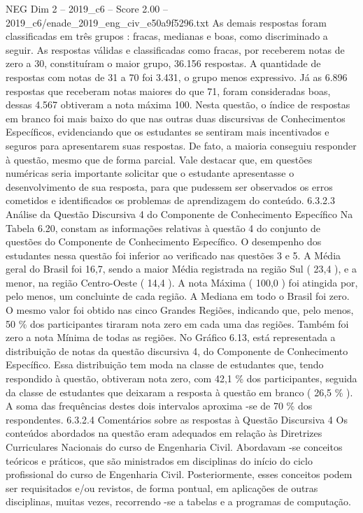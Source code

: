 \begin{textsample}{NEG Dim 2 – 2019\_c6 – Score 2.00 – 2019\_c6/enade\_2019\_eng\_civ\_e50a9f5296.txt}
As demais respostas foram classificadas em três grupos : fracas, medianas e boas, como discriminado a seguir.
As respostas válidas e classificadas como fracas, por receberem notas de zero a 30, constituíram o maior grupo, 36.156 respostas.
A quantidade de respostas com notas de 31 a 70 foi 3.431, o grupo menos expressivo.
Já as 6.896 respostas que receberam notas maiores do que 71, foram consideradas boas, dessas 4.567 obtiveram a nota máxima 100.
Nesta questão, o índice de respostas em branco foi mais baixo do que nas outras duas discursivas de Conhecimentos Específicos, evidenciando que os estudantes se sentiram mais incentivados e seguros para apresentarem suas respostas.
De fato, a maioria conseguiu responder à questão, mesmo que de forma parcial.
Vale destacar que, em questões numéricas seria importante solicitar que o estudante apresentasse o desenvolvimento de sua resposta, para que pudessem ser observados os erros cometidos e identificados os problemas de aprendizagem do conteúdo. 6.3.2.3 Análise da Questão Discursiva 4 do Componente de Conhecimento Específico Na Tabela 6.20, constam as informações relativas à questão 4 do conjunto de questões do Componente de Conhecimento Específico.
O desempenho dos estudantes nessa questão foi inferior ao verificado nas questões 3 e 5.
A Média geral do Brasil foi 16,7, sendo a maior Média registrada na região Sul ( 23,4 ), e a menor, na região Centro-Oeste ( 14,4 ).
A nota Máxima ( 100,0 ) foi atingida por, pelo menos, um concluinte de cada região.
A Mediana em todo o Brasil foi zero.
O mesmo valor foi obtido nas cinco Grandes Regiões, indicando que, pelo menos, 50 \% dos participantes tiraram nota zero em cada uma das regiões.
Também foi zero a nota Mínima de todas as regiões.
No Gráfico 6.13, está representada a distribuição de notas da questão discursiva 4, do Componente de Conhecimento Específico.
Essa distribuição tem moda na classe de estudantes que, tendo respondido à questão, obtiveram nota zero, com 42,1 \% dos participantes, seguida da classe de estudantes que deixaram a resposta à questão em branco ( 26,5 \% ).
A soma das frequências destes dois intervalos aproxima -se de 70 \% dos respondentes. 6.3.2.4 Comentários sobre as respostas à Questão Discursiva 4 Os conteúdos abordados na questão eram adequados em relação às Diretrizes Curriculares Nacionais do curso de Engenharia Civil.
Abordavam -se conceitos teóricos e práticos, que são ministrados em disciplinas do início do ciclo profissional do curso de Engenharia Civil.
Posteriormente, esses conceitos podem ser requisitados e/ou revistos, de forma pontual, em aplicações de outras disciplinas, muitas vezes, recorrendo -se a tabelas e a programas de computação.

\end{textsample}
